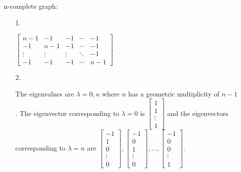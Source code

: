 \documentclass{article}
\begin{document}
\begin{enumerate}
\begin{enumerate}
    \end{enumerate}
    
    \item [n-complete graph: ]
    
    \begin{enumerate}
        \item [1. ]
        
        $\begin{bmatrix}
        n-1 & -1 & -1 & \cdots & -1\\
        -1 & n-1 & -1 & \cdots & -1\\
        \vdots & \vdots & \vdots & \ddots & -1\\
        -1 & -1 & -1 & \cdots & n-1
        \end{bmatrix}$
        
        \item [2. ]
        
        The eigenvalues are $\lambda = 0, n$ where $n$ has a geometric multiplicity of $n-1$. The eigenvector corresponding to $\lambda = 0$ is 
        $\begin{bmatrix}
        1\\
        1\\
        \vdots\\
        1
        \end{bmatrix}$
        and the eigenvectors corresponding to $\lambda = n$ are 
        $\begin{bmatrix}
        -1\\
        1\\
        0\\
        \vdots\\
        0
        \end{bmatrix}, 
        \begin{bmatrix}
        -1\\
        0\\
        1\\
        \vdots\\
        0
        \end{bmatrix}, ..., 
        \begin{bmatrix}
        -1\\
        0\\
        0\\
        \vdots\\
        1
        \end{bmatrix}$.
        
    \end{enumerate}
    
\end{enumerate}
\end{document}
